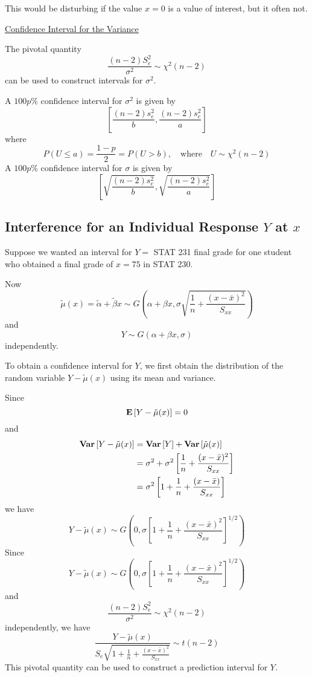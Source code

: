 This would be disturbing if the value $ x=0 $ is a value of interest, but it often not.

\underline{Confidence Interval for the Variance}

The pivotal quantity
\[ \frac{(n-2)S_e^2}{\sigma^2}\sim \chi^2(n-2)  \]
can be used to construct intervals for $ \sigma^2 $.

A $ 100p\% $ confidence interval for $ \sigma^2 $ is given by
\[ \left[ \frac{(n-2)s_e^2}{b} , \frac{(n-2)s_e^2}{a}  \right] \]
where
\[ P(U\leqslant a)=\frac{1-p}{2}=P(U>b),\quad\text{where}\quad U\sim \chi^2(n-2) \]
A $ 100p\% $ confidence interval for $ \sigma $ is given by
\[ \left[ \sqrt{\frac{(n-2)s_e^2}{b}} , \sqrt{\frac{(n-2)s_e^2}{a}}  \right] \]

\subsection{Interference for an Individual Response $ Y $ at $ x $}
Suppose we wanted an interval for $ Y= $ STAT 231 final grade for one student
who obtained a final grade of $ x=75 $ in STAT 230.

Now
\[\tilde{\mu}(x)=\tilde{\alpha}+\tilde{\beta} x \sim G\left(\alpha+\beta x,
    \sigma \sqrt{\frac{1}{n}+\frac{(x-\bar{x})^{2}}{S_{x x}}}\right)\]
and
\[ Y \sim G(\alpha+\beta x, \sigma) \]
independently.

To obtain a confidence interval for $ Y $, we first obtain the distribution
of the random variable $ Y-\tilde{\mu}(x) $ using its mean and variance.

Since
\[ \bm{\mathrm{E}}\left[Y-\tilde{\mu}(x)\right]=0 \]
and
\begin{align*}
    \bm{\mathrm{Var}}\left[Y-\tilde{\mu}(x)\right]
     & =\bm{\mathrm{Var}}\left[Y\right]+\bm{\mathrm{Var}}\left[\tilde{\mu}(x)\right]                                                    \\
     & =\sigma^2+\sigma^2\left[ \frac{1}{n} +\frac{(x-\bar{x})^2}{S_{xx}}  \right]      \\
     & =\sigma^2\left[ 1+\frac{1}{n} + \frac{\left( x-\bar{x} \right)}{S_{xx}}  \right]
\end{align*}
we have
\[ Y-\tilde{\mu}(x)\sim G\left( 0,\sigma\left[ 1+\frac{1}{n} + \frac{\left( x-\bar{x} \right)^2}{S_{xx}}  \right]
    ^{1/2} \right) \]
Since
\[ Y-\tilde{\mu}(x)\sim G\left( 0,\sigma\left[ 1+\frac{1}{n} + \frac{\left( x-\bar{x} \right)^2}{S_{xx}}  \right]
    ^{1/2} \right) \]
and
\[ \frac{(n-2)S_e^2}{\sigma^2}\sim \chi^2(n-2)  \]
independently, we have
\[ \frac{Y-\tilde{\mu}(x)}{S_{e} \sqrt{1+\frac{1}{n}+\frac{(x-\bar{x})^{2}}{S_{x x}}}} \sim t(n-2) \]
This pivotal quantity can be used to construct a prediction interval for $ Y $.

